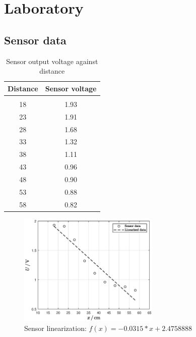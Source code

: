 \newpage


\section{Laboratory} \label{appendix:data}

\subsection{Sensor data} \label{appendix:sensordata}
\begin{table}[H]
\caption[Sensor output voltage against distance]{Sensor output voltage against distance} \label{tab:sensor}
\begin{center}
\begin{tabular}{ c c }
\toprule
Distance & Sensor voltage \\
\midrule\\
18  & 1.93 \\
23  & 1.91 \\
28  & 1.68 \\
33  & 1.32 \\
38  & 1.11 \\
43  & 0.96 \\
48  & 0.90 \\
53  & 0.88 \\
58  & 0.82 \\
\bottomrule
\end{tabular} 
\end{center}
\end{table} 

\FloatBarrier
\begin{figure}[ht]
    \begin{center}
    \includegraphics[angle=0,width=0.6\textwidth]{figure/sensorLinearized.eps}
    \end{center}
    \caption[Sensor linearization]
    {Sensor linearization: $f(x) = -0.0315*x + 2.4758888$}
    \label{fig:sensorLinearization}
\end{figure}
\FloatBarrier

